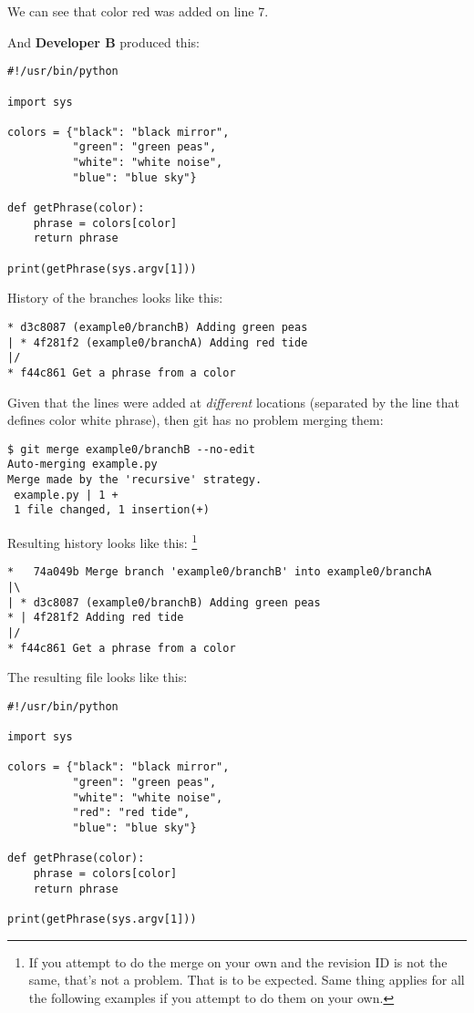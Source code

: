We can see that color red was added on line 7.

And {\bf Developer B} produced this:
\begin{lstlisting}[style=python_style, caption={\bf Example 0} - Developer B]
#!/usr/bin/python

import sys

colors = {"black": "black mirror",
          "green": "green peas",
          "white": "white noise",
          "blue": "blue sky"}

def getPhrase(color):
    phrase = colors[color]
    return phrase

print(getPhrase(sys.argv[1]))
\end{lstlisting}

History of the branches looks like this:
\begin{lstlisting}[style=branch_history_style, caption={\bf Example 0} - branch history]
* d3c8087 (example0/branchB) Adding green peas
| * 4f281f2 (example0/branchA) Adding red tide
|/  
* f44c861 Get a phrase from a color
\end{lstlisting}

Given that the lines were added at {\it different} locations (separated by the line that defines color white phrase), then git has
no problem merging them:

\begin{lstlisting}[style=console_style, caption={\bf Example 0} - git merge output]
$ git merge example0/branchB --no-edit
Auto-merging example.py
Merge made by the 'recursive' strategy.
 example.py | 1 +
 1 file changed, 1 insertion(+)
\end{lstlisting}

Resulting history looks like this: \footnote{If you attempt to do the merge on your own and the revision ID is not the same,
that's not a problem. That is to be expected. Same thing applies for all the following examples if you attempt to do them on your own.}
\begin{lstlisting}[style=branch_history_style, caption={\bf Example 0} - final branch history]
*   74a049b Merge branch 'example0/branchB' into example0/branchA
|\  
| * d3c8087 (example0/branchB) Adding green peas
* | 4f281f2 Adding red tide
|/  
* f44c861 Get a phrase from a color
\end{lstlisting}

The resulting file looks like this:
\begin{lstlisting}[style=python_style, caption={\bf Example 0} - merged code]
#!/usr/bin/python

import sys

colors = {"black": "black mirror",
          "green": "green peas",
          "white": "white noise",
          "red": "red tide",
          "blue": "blue sky"}

def getPhrase(color):
    phrase = colors[color]
    return phrase

print(getPhrase(sys.argv[1]))
\end{lstlisting}


